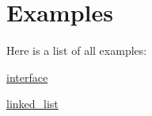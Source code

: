 \section{Examples}
Here is a list of all examples\-:\begin{DoxyCompactItemize}
\item 
\hyperlink{interface-example}{interface}
\item 
\hyperlink{linked_list-example}{linked\-\_\-list}
\end{DoxyCompactItemize}

